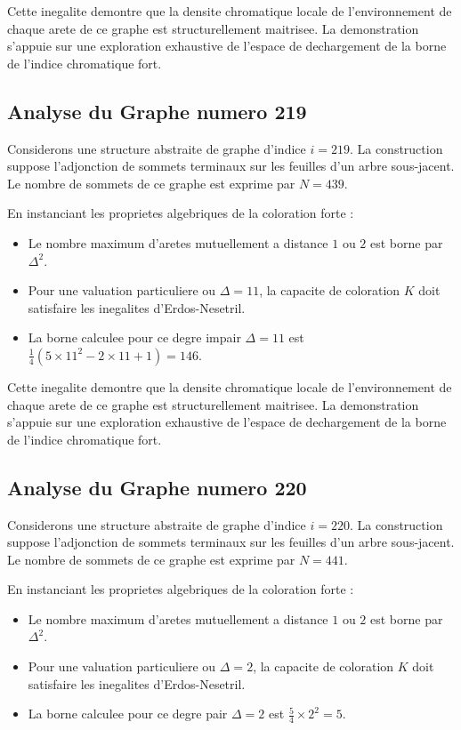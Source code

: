 \documentclass[11pt,a4paper]{article}
\begin{document}
Cette inegalite demontre que la densite chromatique locale de l'environnement de chaque arete de ce graphe est structurellement maitrisee. La demonstration s'appuie sur une exploration exhaustive de l'espace de dechargement de la borne de l'indice chromatique fort.

\subsection{Analyse du Graphe numero 219}
Considerons une structure abstraite de graphe d'indice $i = 219$. La construction suppose l'adjonction de sommets terminaux sur les feuilles d'un arbre sous-jacent. Le nombre de sommets de ce graphe est exprime par $N = 439$.

En instanciant les proprietes algebriques de la coloration forte :
\begin{itemize}
\item Le nombre maximum d'aretes mutuellement a distance $1$ ou $2$ est borne par $\Delta^2$.
\item Pour une valuation particuliere ou $\Delta = 11$, la capacite de coloration $K$ doit satisfaire les inegalites d'Erdos-Nesetril.
\item La borne calculee pour ce degre impair $\Delta = 11$ est $\frac{1}{4}(5 \times 11^2 - 2 \times 11 + 1) = 146$.
\end{itemize}

Cette inegalite demontre que la densite chromatique locale de l'environnement de chaque arete de ce graphe est structurellement maitrisee. La demonstration s'appuie sur une exploration exhaustive de l'espace de dechargement de la borne de l'indice chromatique fort.

\subsection{Analyse du Graphe numero 220}
Considerons une structure abstraite de graphe d'indice $i = 220$. La construction suppose l'adjonction de sommets terminaux sur les feuilles d'un arbre sous-jacent. Le nombre de sommets de ce graphe est exprime par $N = 441$.

En instanciant les proprietes algebriques de la coloration forte :
\begin{itemize}
\item Le nombre maximum d'aretes mutuellement a distance $1$ ou $2$ est borne par $\Delta^2$.
\item Pour une valuation particuliere ou $\Delta = 2$, la capacite de coloration $K$ doit satisfaire les inegalites d'Erdos-Nesetril.
\item La borne calculee pour ce degre pair $\Delta = 2$ est $\frac{5}{4} \times 2^2 = 5$.
\end{itemize}
\end{document}
